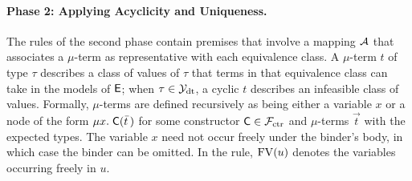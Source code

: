 \paragraph{Phase 2: Applying Acyclicity and Uniqueness.}
The rules of the second phase contain premises that involve a mapping $\mathcal{A}$
that associates a $\mu$-term as representative with each equivalence class.
A $\mu$-term $t$ of type $\tau$ describes a class of values of
$\tau$ that terms in that equivalence class can take in the models of $\mathsf{E}$;
when $\tau \in \mathcal{Y}_{\mathrm{dt}}$, a cyclic $t$ describes an infeasible class of values.
Formally, $\mu$-terms are defined recursively as being either a variable $x$
or a node of the form
$\mu x.\; \textsf{C}( \bar t\, )$ for some constructor $\textsf{C} \in \mathcal{F}_{\mathrm{ctr}}$ and
$\mu$-terms $\vec t$ with the expected types.
The variable $x$ need not occur freely under the binder's body, in which case the
binder can be omitted.
In the  rule,
$\mathrm{FV}( u )$ denotes the variables occurring freely in $u$.

%


